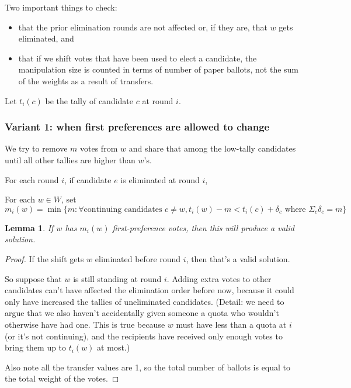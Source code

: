 \documentclass[10pt,a4paper]{article}
\newtheorem{lemma}{Lemma}
\begin{document}
Two important things to check:
\begin{itemize}
	\item that the prior elimination rounds are not affected or, if they are, that $w$ gets eliminated, and
	\item that if we shift votes that have been used to elect a candidate, the manipulation size is counted in terms of number of paper ballots, not the sum of the weights as a result of transfers.
\end{itemize}

Let $t_i(c)$ be the tally of candidate $c$ at round $i$.

\subsubsection{Variant 1: when first preferences are allowed to change}
We try to remove $m$ votes from $w$ and share that among the low-tally candidates until all other tallies are higher than $w$'s.

For each round $i$, if candidate $e$ is eliminated at round $i$,

For each $w \in W$, set 
\begin{equation} m_i(w) = \min \{m :  \forall \text{continuing candidates }  c \neq w, 
	t_i(w) - m < t_i(c) + \delta_c  \text{ where } \Sigma_c \delta_c = m   \}  
\label{eqn:margin} \end{equation}


\begin{lemma}
If $w$ has $m_i(w)$ first-preference votes, then this will produce a valid solution.  
\end{lemma}
\begin{proof}
If the shift gets $w$ eliminated before round $i$, then that's a valid solution.  

So suppose that $w$ is still standing at round $i$.  Adding extra votes to other candidates can't have affected the elimination order before now, because it could only have increased the tallies of uneliminated candidates.  (Detail: we need to argue that we also haven't accidentally given someone a quota who wouldn't otherwise have had one.  This is true because $w$ must have less than a quota at $i$ (or it's not continuing), and the recipients have received only enough votes to bring them up to $t_i(w)$ at most.)

Also note all the transfer values are 1, so the total number of ballots is equal to the total weight of the votes.
\end{proof}
\end{document}
